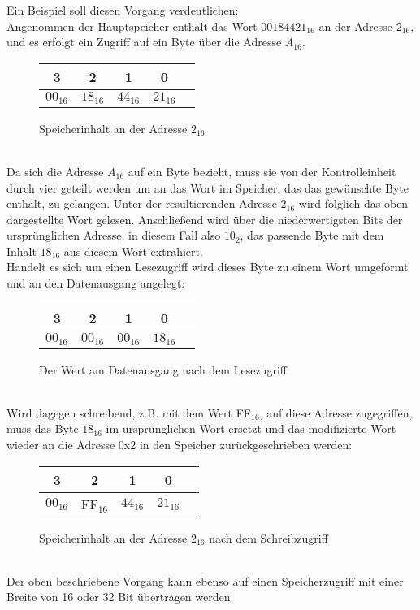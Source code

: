 Ein Beispiel soll diesen Vorgang verdeutlichen:\\
Angenommen der Hauptspeicher enthält das Wort $00184421_{16}$ an der Adresse $2_{16}$,
und es erfolgt ein Zugriff auf ein Byte über die Adresse $A_{16}$.
\begin{figure} [htpb]
    \centering
        \begin{tabular}{|c|c|c|c|c|}
            \multicolumn{1}{c}{3} & \multicolumn{1}{c}{2} &  \multicolumn{1}{c}{1}& \multicolumn{1}{c}{0}\\
            \hline
            $00_{16}$ & $18_{16}$ & $44_{16}$ & $21_{16}$\\
            \hline
        \end{tabular}
        \caption{Speicherinhalt an der Adresse $2_{16}$}
\end{figure}
\\                                                        
Da sich die Adresse $A_{16}$ auf ein Byte bezieht, muss sie von der Kontrolleinheit durch vier geteilt werden um an das Wort im Speicher, das das gewünschte Byte enthält, zu gelangen.
Unter der resultierenden Adresse $2_{16}$ wird folglich das oben dargestellte Wort gelesen.
Anschließend wird über die niederwertigsten Bits der ursprünglichen Adresse, in diesem Fall also $10_2$, das passende Byte mit dem Inhalt $18_{16}$ aus diesem Wort extrahiert.\\
Handelt es sich um einen Lesezugriff wird dieses Byte zu einem Wort umgeformt und an den Datenausgang angelegt:\\
\begin{figure} [htpb]
    \centering
        \begin{tabular}{|c|c|c|c|c|}
            \multicolumn{1}{c}{3} & \multicolumn{1}{c}{2} &  \multicolumn{1}{c}{1}& \multicolumn{1}{c}{0}\\
            \hline
            $00_{16}$ & $00_{16}$ & $00_{16}$ & $18_{16}$\\
            \hline
        \end{tabular}
        \caption{Der Wert am Datenausgang nach dem Lesezugriff}
\end{figure}\\
Wird dagegen schreibend, z.B. mit dem Wert FF$_{16}$,  auf diese Adresse zugegriffen, muss das Byte $18_{16}$ im ursprünglichen Wort ersetzt und das modifizierte Wort wieder an die Adresse 0x2 in den Speicher zurückgeschrieben werden:
\begin{figure} [htpb]
    \centering
        \begin{tabular}{|c|c|c|c|c|}
            \multicolumn{1}{c}{3} & \multicolumn{1}{c}{2} &  \multicolumn{1}{c}{1}& \multicolumn{1}{c}{0}\\
            \hline
            $00_{16}$ & FF$_{16}$ & $44_{16}$ & $21_{16}$\\
            \hline
        \end{tabular}
        \caption{Speicherinhalt an der Adresse $2_{16}$ nach dem Schreibzugriff}
\end{figure}\\
Der oben beschriebene Vorgang kann ebenso auf einen Speicherzugriff mit einer Breite von 16 oder 32 Bit übertragen werden.






